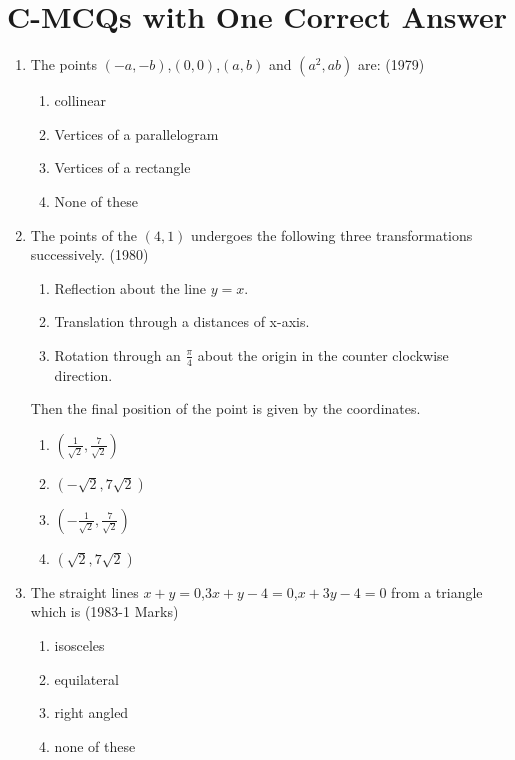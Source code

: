 \documentclass[journal,12pt,twocolumn]{IEEEtran}
\theoremstyle{remark}
\begin{document}
\section {C-MCQs with One Correct Answer}
\begin{enumerate}
    \item The points $(-a,-b)$,$(0,0)$,$(a,b)$ and $(a^2,ab)$ are:
    \hfill(1979)
    \begin{enumerate}
        \item collinear
        \item Vertices of a parallelogram
        \item Vertices of a rectangle 
        \item None of these
    \end{enumerate}
    \item The points of the $(4,1)$ undergoes the following three transformations successively.
    \hfill(1980)
    \begin{enumerate}
        \item Reflection about the line $y=x.$
        \item Translation through a distances of x-axis.
        \item Rotation through an $\frac{\pi}{4}$ about the origin in the counter clockwise direction.
    \end{enumerate}
    Then the final position of the point is given by the coordinates.
    \begin{multicols}{2} 		
    \begin{enumerate}
        \item $\left(\frac{1}{\sqrt{2}},\frac{7}{\sqrt{2}} \right)$
        \item $(-\sqrt{2},7\sqrt{2})$
        \item $\left(-\frac{1}{\sqrt{2}},\frac{7}{\sqrt{2}} \right)$
        \item $(\sqrt{2},7\sqrt{2})$
    \end{enumerate} 
    \end{multicols}	    
    \item The straight lines $x+y=0$,$3x+y-4=0$,$x+3y-4=0$ from a triangle which is 
    \hfill(1983-1 Marks)
    \begin{multicols}{2}	
    \begin{enumerate}
        \item isosceles
        \item equilateral 
        \item right angled
        \item none of these

\end{enumerate}
\end{multicols}
\end{enumerate}
\end{document}
